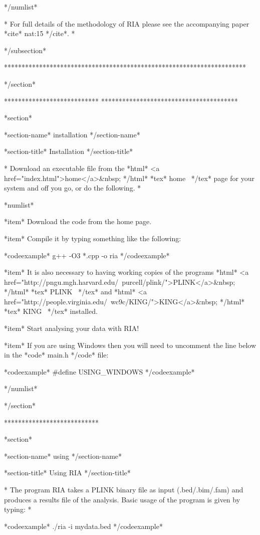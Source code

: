*/numlist*


*
For full details of the methodology of RIA please see the accompanying paper *cite* nat:15 */cite*.
*

*/subsection*



*********************************************************************

*/section*

***************************
***************************************

*section*

*section-name* installation */section-name*

*section-title* Installation */section-title*

*
Download an executable file from the *html* <a href="index.html">home</a>&nbsp; */html* *tex* home~ */tex* page for your system and off you go, or do the following.
*

*numlist*

*item* Download the code from the home page.

*item* Compile it by typing something like the following:

*codeexample*
g++ -O3 *.cpp -o ria
*/codeexample*

*item* It is also necessary to having working copies of the programs *html* <a href="http://pngu.mgh.harvard.edu/~purcell/plink/">PLINK</a>&nbsp; */html* *tex* PLINK~ */tex* and *html* <a href="http://people.virginia.edu/~wc9c/KING/">KING</a>&nbsp; */html* *tex* KING~ */tex* installed.

*item* Start analysing your data with RIA!

*item* If you are using Windows then you will need to uncomment the line below in the *code* main.h */code* file:

*codeexample*
#define USING_WINDOWS
*/codeexample*

*/numlist*

*/section*

***************************

*section*

*section-name*
using
*/section-name*

*section-title*
Using RIA
*/section-title*

*
The program RIA takes a PLINK binary file as input (.bed/.bim/.fam) and produces a results file of the analysis. Basic usage of the program is given by typing:
*

*codeexample*
./ria -i mydata.bed
*/codeexample*

